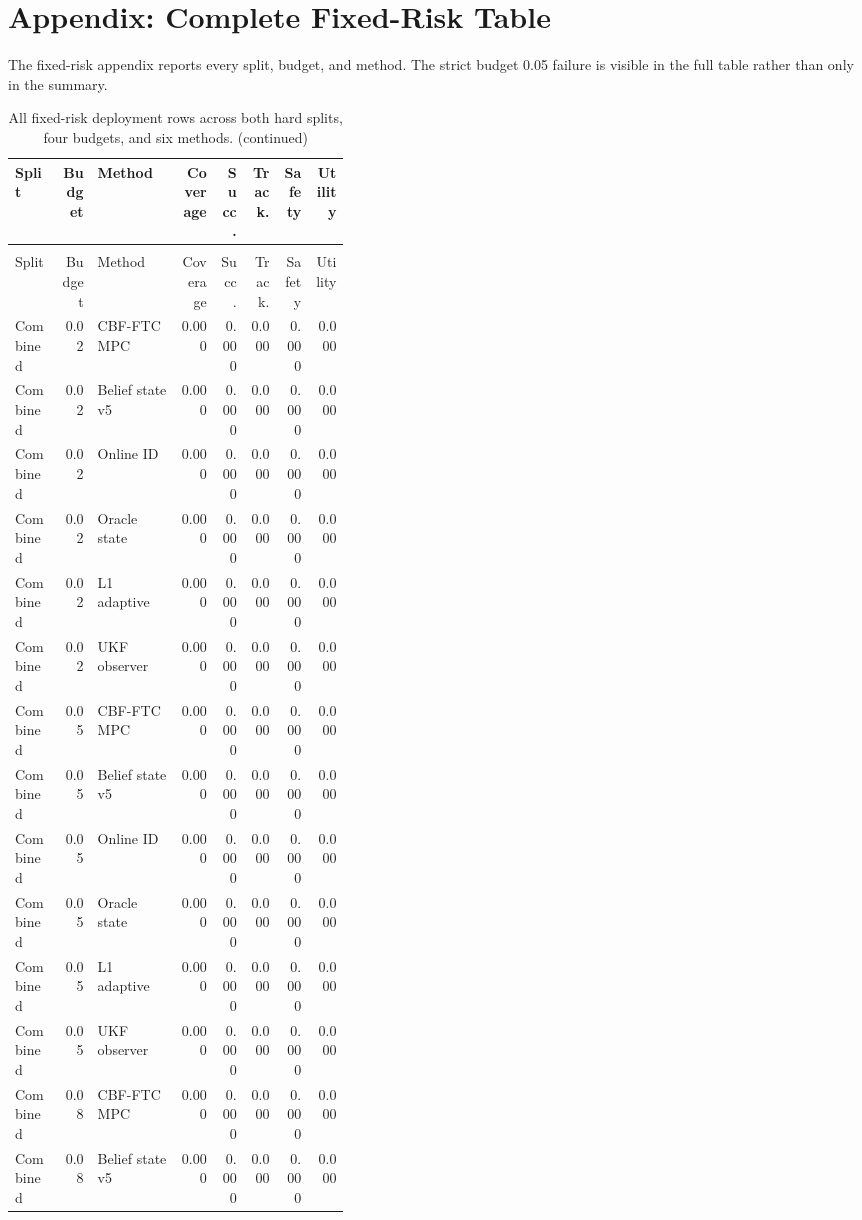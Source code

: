 \documentclass{article}
\begin{document}
\section{Appendix: Complete Fixed-Risk Table}
The fixed-risk appendix reports every split, budget, and method. The strict budget 0.05 failure is visible in the full table rather than only in the summary.
\begin{center}
\tiny
\begin{longtable}{p{0.14\linewidth}rp{0.25\linewidth}rrrrr}
\caption{All fixed-risk deployment rows across both hard splits, four budgets, and six methods.}\label{tab:full-fixed}\\
\toprule
Split & Budget & Method & Coverage & Succ. & Track. & Safety & Utility\\
\midrule
\endfirsthead
\caption[]{All fixed-risk deployment rows across both hard splits, four budgets, and six methods. (continued)}\\
\toprule
Split & Budget & Method & Coverage & Succ. & Track. & Safety & Utility\\
\midrule
\endhead
Combined & 0.02 & CBF-FTC MPC & 0.000 & 0.000 & 0.000 & 0.000 & 0.000\\
Combined & 0.02 & Belief state v5 & 0.000 & 0.000 & 0.000 & 0.000 & 0.000\\
Combined & 0.02 & Online ID & 0.000 & 0.000 & 0.000 & 0.000 & 0.000\\
Combined & 0.02 & Oracle state & 0.000 & 0.000 & 0.000 & 0.000 & 0.000\\
Combined & 0.02 & L1 adaptive & 0.000 & 0.000 & 0.000 & 0.000 & 0.000\\
Combined & 0.02 & UKF observer & 0.000 & 0.000 & 0.000 & 0.000 & 0.000\\
Combined & 0.05 & CBF-FTC MPC & 0.000 & 0.000 & 0.000 & 0.000 & 0.000\\
Combined & 0.05 & Belief state v5 & 0.000 & 0.000 & 0.000 & 0.000 & 0.000\\
Combined & 0.05 & Online ID & 0.000 & 0.000 & 0.000 & 0.000 & 0.000\\
Combined & 0.05 & Oracle state & 0.000 & 0.000 & 0.000 & 0.000 & 0.000\\
Combined & 0.05 & L1 adaptive & 0.000 & 0.000 & 0.000 & 0.000 & 0.000\\
Combined & 0.05 & UKF observer & 0.000 & 0.000 & 0.000 & 0.000 & 0.000\\
Combined & 0.08 & CBF-FTC MPC & 0.000 & 0.000 & 0.000 & 0.000 & 0.000\\
Combined & 0.08 & Belief state v5 & 0.000 & 0.000 & 0.000 & 0.000 & 0.000\\

\end{longtable}
\end{center}
\end{document}
